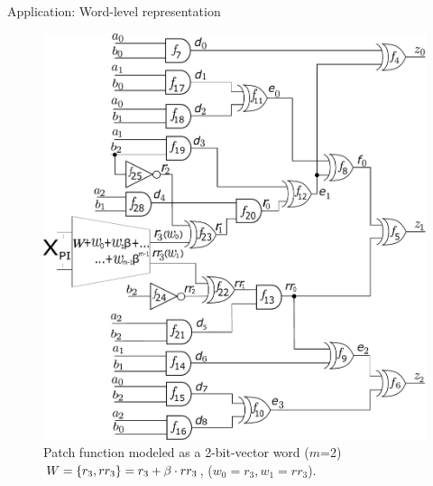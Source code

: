 \begin{frame}{\large Application: Word-level representation}
\begin{figure}[hbt]
\centering
    \includegraphics[scale = 0.24]{mas_3_ddc_mfr_b.pdf}
    \caption*{
    Patch function modeled as a 2-bit-vector word ($m$=2) $W=\{r_3,rr_3\} = r_3+\beta\cdot rr_3$, ($w_0=r_3, w_1=rr_3$).}
    \label{fig:mas_bug_Wb}
\end{figure}
\end{frame}


